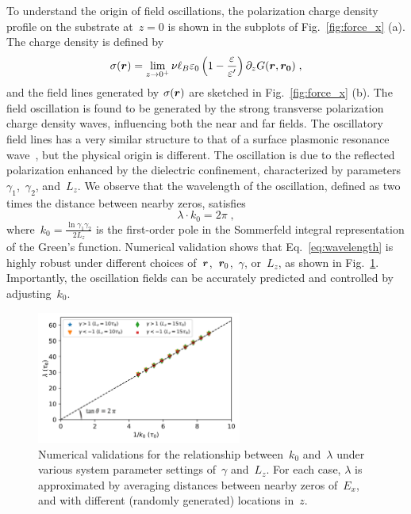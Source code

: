 To understand the origin of field oscillations, the polarization charge density profile on the substrate at~$z=0$ is shown in the subplots of Fig.~\ref{fig:force_x} (a).
The charge density is defined by 
\begin{equation}
    \sigma(\boldsymbol{r}) = \lim_{z \to 0^+} \nu \ell_B \varepsilon_0  \left( 1 - \frac{\varepsilon}{\varepsilon'} \right) \partial_z G(\boldsymbol{r}, \boldsymbol{r_0})\;,
\end{equation}
and the field lines generated by $\sigma(\boldsymbol{r})$ are sketched in Fig.~\ref{fig:force_x} (b). 
The field oscillation is found to be generated by the strong transverse polarization charge density waves, influencing both the near and far fields. 
The oscillatory field lines has a very similar structure to that of a surface plasmonic resonance wave~\cite{willets2007localized}, but the physical origin is different. 
The oscillation is due to the reflected polarization enhanced by the dielectric confinement, characterized by parameters~$\gamma_1$,~$\gamma_2$, and~$L_z$.
We observe that the wavelength of the oscillation, defined as two times the distance between nearby zeros, satisfies 
\begin{equation}\label{eq:wavelength}
    \lambda \cdot k_0 = 2 \pi \;,
\end{equation}
where~$k_0 = \frac{\ln{\gamma_1 \gamma_2}}{2 L_z}$ is the first-order pole in the Sommerfeld integral representation of the Green's function.
Numerical validation shows that Eq.~\eqref{eq:wavelength} is highly robust under different choices of~$\boldsymbol{r}$,~$\boldsymbol{r}_0$,~$\gamma$, or~$L_z$, as shown in Fig.~\ref{fig:k_wavelegth}.
Importantly, the oscillation fields can be accurately predicted and controlled by adjusting~$k_0$. 

\begin{figure}[htbp]
    \centering
    \includegraphics[width=0.6\textwidth]{figs/fig3.pdf}
    \caption{
        Numerical validations for the relationship between~$k_0$ and~$\lambda$ under various system parameter settings of~$\gamma$ and~$L_z$. For each case, $\lambda$ is approximated by averaging distances between nearby zeros of~$E_x$, and with different (randomly generated) locations in~$z$. 
    }
    \label{fig:k_wavelegth}
\end{figure}
